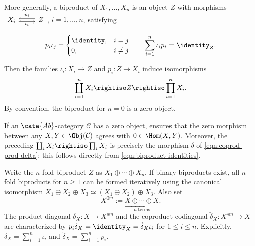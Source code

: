 More generally, a biproduct of $X_1,\ldots,X_n$ is an object $Z$ with morphisms
$\begin{tikzcd} X_i \arrow[r, yshift=-0.5ex, "\iota_i"'] & Z \arrow[l, yshift=0.5ex, "p_i"'] \end{tikzcd}$,
$i=1,\ldots,n$, satisfying

\begin{equation}\label{eqn:biproduct-identities}\begin{gathered}
	p_i \iota_j = \begin{cases} \identity, & i=j \\ 0, & i \neq j \end{cases} \qquad
	\sum_{i=1}^n \iota_i p_i = \identity_{Z}.
\end{gathered}\end{equation}

Then the families $\iota_i:X_i\to Z$ and $p_i:Z\to X_i$ induce isomorphisms
\[ \coprod_{i=1}^n X_i \rightiso Z \rightiso \prod_{i=1}^n X_i. \]
By convention, the biproduct for $n=0$ is a zero object.

If an $\cate{Ab}$-category $\mathcal C$ has a zero object, \cite[Lemma~3.4.11]{Li1} ensures that the zero morphism between any $X,Y\in\Obj(\mathcal C)$ agrees with $0\in\Hom(X,Y)$. Moreover, the preceding $\coprod_iX_i\rightiso\prod_iX_i$ is precisely the morphism $\delta$ of \eqref{eqn:coprod-prod-delta}; this follows directly from \eqref{eqn:biproduct-identities}.

\begin{convention}\label{con:biproduct}
	Write the $n$-fold biproduct $Z$ as $X_1\oplus\cdots\oplus X_n$. If binary biproducts exist, all $n$-fold biproducts for $n\geq1$ can be formed iteratively using the canonical isomorphism $X_1\oplus X_2\oplus X_3\simeq(X_1\oplus X_2)\oplus X_3$. Also set
	\[ X^{\oplus n} := \underbracket{X \oplus \cdots \oplus X}_{n\; \text{terms}}. \]
	The product diagonal $\delta_X:X\to X^{\oplus n}$ and the coproduct codiagonal $\check\delta_X:X^{\oplus n}\to X$ are characterized by $p_i\delta_X=\identity_X=\check\delta_X\iota_i$ for $1\leq i\leq n$. Explicitly, $\delta_X=\sum_{i=1}^n\iota_i$ and $\check\delta_X=\sum_{i=1}^np_i$.
\end{convention}


